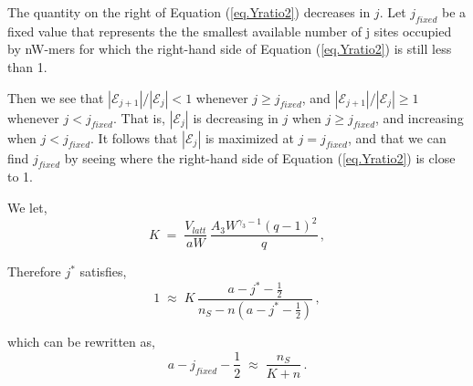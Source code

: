 \documentclass[journal=mamobx,manuscript=article]{achemso}
\begin{document}
The quantity on the right of Equation (\ref{eq.Yratio2}) decreases in $j$.  
Let $j_{fixed}$ be a fixed value that represents the the smallest available number of j sites occupied by nW-mers for which the right-hand side of Equation (\ref{eq.Yratio2}) is still less than 1.

Then we see that $|\mathcal{E}_{j+1}|/|\mathcal{E}_j|<1$ whenever $j\geq j_{fixed}$, and 
$|\mathcal{E}_{j+1}|/|\mathcal{E}_j|\geq 1$ whenever $j< j_{fixed}$.
That is, $|\mathcal{E}_j|$ is decreasing in $j$ when $j\geq j_{fixed}$, and 
increasing when $j< j_{fixed}$.
It follows that $|\mathcal{E}_j|$ is maximized at $j=j_{fixed}$, and that we can find $j_{fixed}$ by seeing 
where the right-hand side of Equation (\ref{eq.Yratio2}) is close to 1.   

\noindent We let, 
\begin{equation}
    \label{}
K \;=\;   \frac{ V_{latt} }{aW}\, \frac{   A_3W^{\gamma_3-1}(q-1)^2}{q} \,,
\end{equation}


\noindent Therefore $j^*$ satisfies,
\begin{equation}
    \label{}
    1  \;\approx \; 
     K  \,
          \frac{a-j^*-\frac{1}{2}}{n_S-n(a-j^*-\frac{1}{2})}    \,,  
\end{equation}

\noindent which can be rewritten as, 
\begin{equation}
    \label{}
a-j_{fixed}-\frac{1}{2} \; \approx\;    \frac{n_S}{K+n}   \,.
\end{equation}

\newpage
\end{document}
